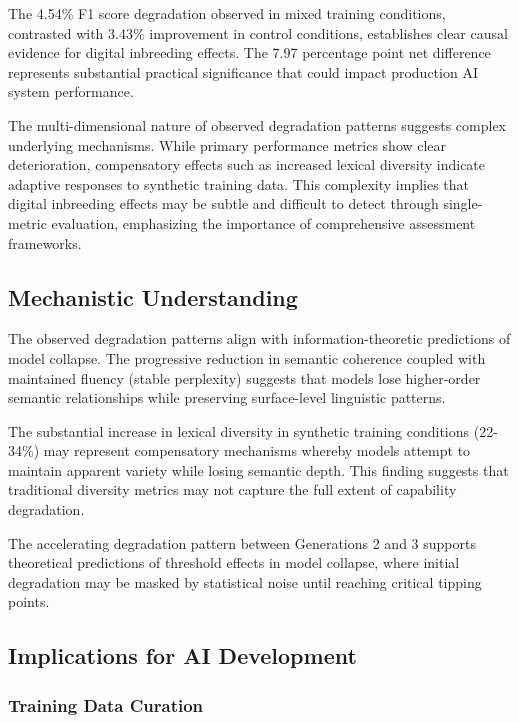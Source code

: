 \documentclass[11pt]{article}
\begin{document}
The 4.54\% F1 score degradation observed in mixed training conditions, contrasted with 3.43\% improvement in control conditions, establishes clear causal evidence for digital inbreeding effects. The 7.97 percentage point net difference represents substantial practical significance that could impact production AI system performance.

The multi-dimensional nature of observed degradation patterns suggests complex underlying mechanisms. While primary performance metrics show clear deterioration, compensatory effects such as increased lexical diversity indicate adaptive responses to synthetic training data. This complexity implies that digital inbreeding effects may be subtle and difficult to detect through single-metric evaluation, emphasizing the importance of comprehensive assessment frameworks.

\subsection{Mechanistic Understanding}

The observed degradation patterns align with information-theoretic predictions of model collapse. The progressive reduction in semantic coherence coupled with maintained fluency (stable perplexity) suggests that models lose higher-order semantic relationships while preserving surface-level linguistic patterns.

The substantial increase in lexical diversity in synthetic training conditions (22-34\%) may represent compensatory mechanisms whereby models attempt to maintain apparent variety while losing semantic depth. This finding suggests that traditional diversity metrics may not capture the full extent of capability degradation.

The accelerating degradation pattern between Generations 2 and 3 supports theoretical predictions of threshold effects in model collapse, where initial degradation may be masked by statistical noise until reaching critical tipping points.

\subsection{Implications for AI Development}

\subsubsection{Training Data Curation}
\end{document}
